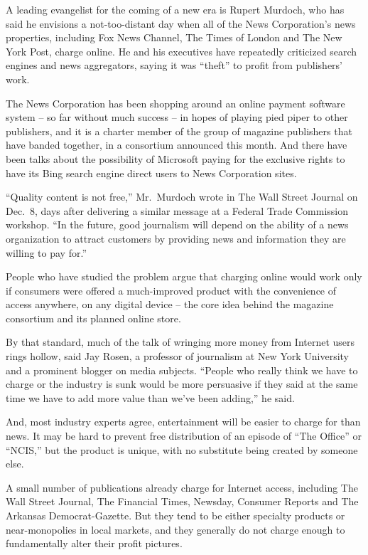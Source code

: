 ﻿\documentclass[12pt]{article}
\begin{document}
A leading evangelist for the coming of a new era is Rupert Murdoch, who has said he envisions a
not-too-distant day when all of the News Corporation's news properties, including Fox News Channel,
The Times of London and The New York Post, charge online. He and his executives have repeatedly
criticized search engines and news aggregators, saying it was ``theft'' to profit from publishers'
work.

The News Corporation has been shopping around an online payment software system -- so far without
much success -- in hopes of playing pied piper to other publishers, and it is a charter member of
the group of magazine publishers that have banded together, in a consortium announced this month.
And there have been talks about the possibility of Microsoft paying for the exclusive rights to have
its Bing search engine direct users to News Corporation sites.

``Quality content is not free,'' Mr.~Murdoch wrote in The Wall Street Journal on Dec.~8, days after
delivering a similar message at a Federal Trade Commission workshop. ``In the future, good
journalism will depend on the ability of a news organization to attract customers by providing news
and information they are willing to pay for.''

People who have studied the problem argue that charging online would work only if consumers were
offered a much-improved product with the convenience of access anywhere, on any digital device --
the core idea behind the magazine consortium and its planned online store.

By that standard, much of the talk of wringing more money from Internet users rings hollow, said Jay
Rosen, a professor of journalism at New York University and a prominent blogger on media subjects.
``People who really think we have to charge or the industry is sunk would be more persuasive if they
said at the same time we have to add more value than we've been adding,'' he said.

And, most industry experts agree, entertainment will be easier to charge for than news. It may be
hard to prevent free distribution of an episode of ``The Office'' or ``NCIS,'' but the product is
unique, with no substitute being created by someone else.

A small number of publications already charge for Internet access, including The Wall Street
Journal, The Financial Times, Newsday, Consumer Reports and The Arkansas Democrat-Gazette. But they
tend to be either specialty products or near-monopolies in local markets, and they generally do not
charge enough to fundamentally alter their profit pictures.
\end{document}
